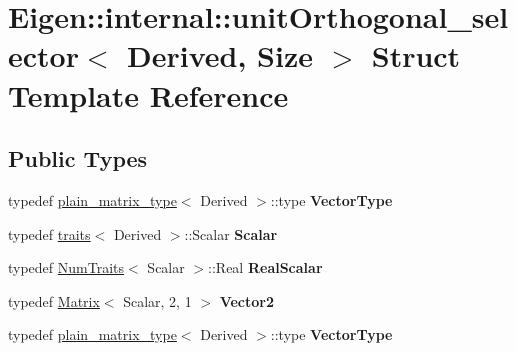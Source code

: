 \hypertarget{struct_eigen_1_1internal_1_1unit_orthogonal__selector}{}\section{Eigen\+:\+:internal\+:\+:unit\+Orthogonal\+\_\+selector$<$ Derived, Size $>$ Struct Template Reference}
\label{struct_eigen_1_1internal_1_1unit_orthogonal__selector}
\subsection*{Public Types}
\begin{DoxyCompactItemize}
\item 
\mbox{\label{struct_eigen_1_1internal_1_1unit_orthogonal__selector_a7c520ffbb978b132615ff5acaa17a0ff}} 
typedef \hyperlink{struct_eigen_1_1internal_1_1plain__matrix__type}{plain\+\_\+matrix\+\_\+type}$<$ Derived $>$\+::type {\bfseries Vector\+Type}
\item 
\mbox{\label{struct_eigen_1_1internal_1_1unit_orthogonal__selector_a5cb64d039b9a1510ece90194f6c9f0ec}} 
typedef \hyperlink{struct_eigen_1_1internal_1_1traits}{traits}$<$ Derived $>$\+::Scalar {\bfseries Scalar}
\item 
\mbox{\label{struct_eigen_1_1internal_1_1unit_orthogonal__selector_a6c53727bb80397fcb53e42fb76c7de1b}} 
typedef \hyperlink{group___core___module_struct_eigen_1_1_num_traits}{Num\+Traits}$<$ Scalar $>$\+::Real {\bfseries Real\+Scalar}
\item 
\mbox{\label{struct_eigen_1_1internal_1_1unit_orthogonal__selector_a79907d0ae18d8b1b56f889972fc820e8}} 
typedef \hyperlink{group___core___module_class_eigen_1_1_matrix}{Matrix}$<$ Scalar, 2, 1 $>$ {\bfseries Vector2}
\item 
\mbox{\label{struct_eigen_1_1internal_1_1unit_orthogonal__selector_a7c520ffbb978b132615ff5acaa17a0ff}} 
typedef \hyperlink{struct_eigen_1_1internal_1_1plain__matrix__type}{plain\+\_\+matrix\+\_\+type}$<$ Derived $>$\+::type {\bfseries Vector\+Type}

\end{DoxyCompactItemize}

